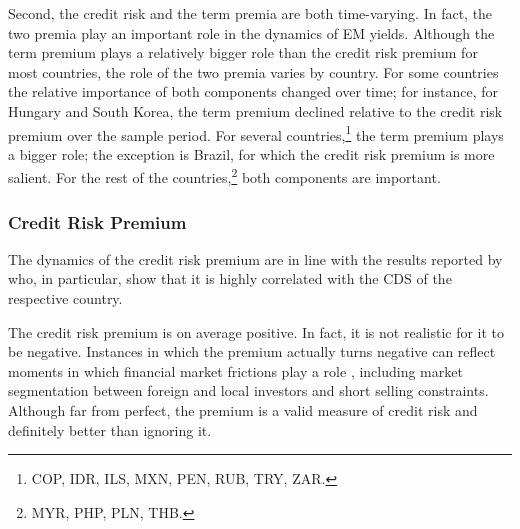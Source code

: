 {Second, the credit risk and the term premia are both time-varying. 
In fact, the two premia play an important role in the dynamics of EM yields.
Although the term premium plays a relatively bigger role than the credit risk premium for most countries,
the role of the two premia varies by country.
For some countries the relative importance of both components changed over time; for instance, for Hungary and South Korea, the term premium declined relative to the credit risk premium over the sample period.
For several countries,\footnote{ COP, IDR, ILS, MXN, PEN, RUB, TRY, ZAR.} the term premium plays a bigger role; the exception is Brazil, for which the credit risk premium is more salient.
For the rest of the countries,\footnote{ MYR, PHP, PLN, THB.} both components are important.


\subsubsection{Credit Risk Premium}
The dynamics of the credit risk premium are in line with the results reported by \cite{DuSchreger:2016JoF} who, in particular, show that it is highly correlated with the CDS of the respective country.

The credit risk premium is on average positive. 
In fact, it is not realistic for it to be negative. 
Instances in which the premium actually turns negative can reflect moments in which financial market frictions play a role \citep{DuSchreger:2016JoF}, including market segmentation between foreign and local investors and short selling constraints.
Although far from perfect, the premium is a valid measure of credit risk and definitely better than ignoring it. 

}
